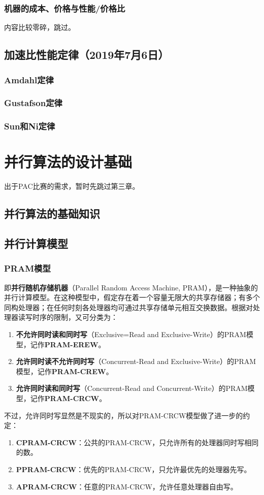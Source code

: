 \documentclass{article}
\begin{document}
			\subsubsection{机器的成本、价格与性能/价格比}
				内容比较零碎，跳过。
		\subsection{加速比性能定律（2019年7月6日）}
			\subsubsection{Amdahl定律}
			\subsubsection{Gustafson定律}
			\subsubsection{Sun和Ni定律}
	\section{并行算法的设计基础}
		出于PAC比赛的需求，暂时先跳过第三章。
		\subsection{并行算法的基础知识}
		\subsection{并行计算模型}
			\subsubsection{PRAM模型}
				即\textbf{并行随机存储机器}（Parallel Random Access Machine, PRAM），是一种抽象的并行计算模型。在这种模型中，假定存在着一个容量无限大的共享存储器；有多个同构处理器；在任何时刻各处理器均可通过共享存储单元相互交换数据。根据对处理器读写时序的限制，又可分类为：
				\begin{enumerate}
					\item \textbf{不允许同时读和同时写}（Exclusive=Read and Exclusive-Write）的PRAM模型，记作\textbf{PRAM-EREW}。
					\item \textbf{允许同时读不允许同时写}（Concurrent-Read and Exclusive-Write）的PRAM模型，记作\textbf{PRAM-CREW}。
					\item \textbf{允许同时读和同时写}（Concurrent-Read and Concurrent-Write）的PRAM模型，记作\textbf{PRAM-CRCW}。
				\end{enumerate}
				不过，允许同时写显然是不现实的，所以对PRAM-CRCW模型做了进一步的约定：
				\begin{enumerate}
					\item \textbf{CPRAM-CRCW}：公共的PRAM-CRCW，只允许所有的处理器同时写相同的数。
					\item \textbf{PPRAM-CRCW}：优先的PRAM-CRCW，只允许最优先的处理器先写。
					\item \textbf{APRAM-CRCW}：任意的PRAM-CRCW，允许任意处理器自由写。
				\end{enumerate}
\end{document}

